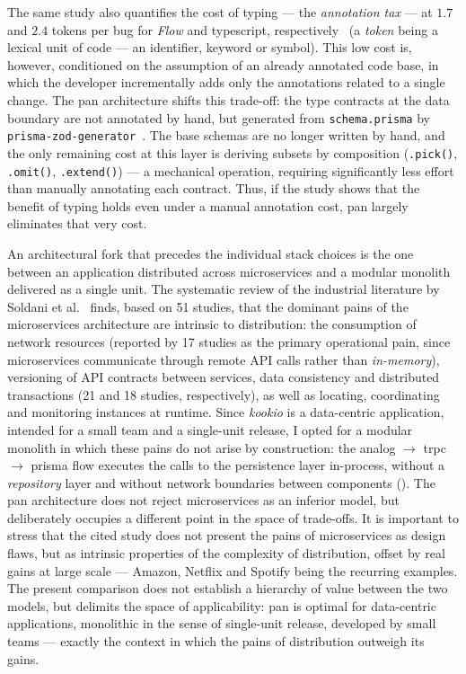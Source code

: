 The same study also quantifies the cost of typing --- the \textit{annotation tax} --- at \(1.7\) and \(2.4\) tokens per bug for \textit{Flow} and \gls{typescript}, respectively~\cite{gao2017type} (a \textit{token} being a lexical unit of code --- an identifier, keyword or symbol). This low cost is, however, conditioned on the assumption of an already annotated code base, in which the developer incrementally adds only the annotations related to a single change. The \gls{pan} architecture shifts this trade-off: the type contracts at the data boundary are not annotated by hand, but generated from \texttt{schema.prisma} by \texttt{prisma-zod-generator}~\cite{prisma_zod_generator}. The base schemas are no longer written by hand, and the only remaining cost at this layer is deriving subsets by composition (\texttt{.pick()}, \texttt{.omit()}, \texttt{.extend()}) --- a mechanical operation, requiring significantly less effort than manually annotating each contract. Thus, if the study shows that the benefit of typing holds even under a manual annotation cost, \gls{pan} largely eliminates that very cost.

An architectural fork that precedes the individual stack choices is the one between an application distributed across microservices and a modular monolith delivered as a single unit. The systematic review of the industrial literature by Soldani et al.~\cite{soldani2018} finds, based on 51 studies, that the dominant pains of the microservices architecture are intrinsic to distribution: the consumption of network resources (reported by 17 studies as the primary operational pain, since microservices communicate through remote API calls rather than \textit{in-memory}), versioning of API contracts between services, data consistency and distributed transactions (21 and 18 studies, respectively), as well as locating, coordinating and monitoring instances at runtime. Since \textit{\gls{kookio}} is a data-centric application, intended for a small team and a single-unit release, I opted for a modular monolith in which these pains do not arise by construction: the \gls{analog} \(\rightarrow\) \gls{trpc} \(\rightarrow\) \gls{prisma} flow executes the calls to the persistence layer in-process, without a \textit{repository} layer and without network boundaries between components (). The \gls{pan} architecture does not reject microservices as an inferior model, but deliberately occupies a different point in the space of trade-offs.
It is important to stress that the cited study does not present the pains of microservices as design flaws, but as intrinsic properties of the complexity of distribution, offset by real gains at large scale --- Amazon, Netflix and Spotify being the recurring examples. The present comparison does not establish a hierarchy of value between the two models, but delimits the space of applicability: \gls{pan} is optimal for data-centric applications, monolithic in the sense of single-unit release, developed by small teams --- exactly the context in which the pains of distribution outweigh its gains.

